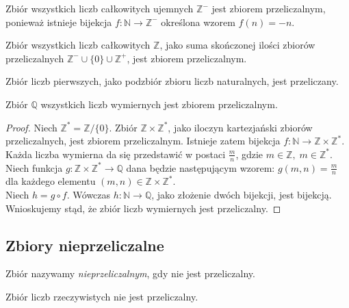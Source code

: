 	\begin{przyk}
		Zbiór wszystkich liczb całkowitych ujemnych $\mathbb{Z}^-$ jest zbiorem przeliczalnym, ponieważ istnieje bijekcja $f:\mathbb{N} \to \mathbb{Z}^-$ określona wzorem $f(n) = -n$.
	\end{przyk}
	
	\begin{przyk}
		Zbiór wszystkich liczb całkowitych $\mathbb{Z}$, jako suma skończonej ilości zbiorów przeliczalnych $\mathbb{Z}^- \cup \{0\} \cup \mathbb{Z}^+$, jest zbiorem przeliczalnym.
	\end{przyk}
	
	\begin{przyk}
		Zbiór liczb pierwszych, jako podzbiór zbioru liczb naturalnych, jest przeliczany.
	\end{przyk}
	
	\begin{przyk}
		Zbiór $\mathbb{Q}$ wszystkich liczb wymiernych jest zbiorem przeliczalnym.
		\begin{proof}
			Niech $\mathbb{Z}^{*} = \mathbb{Z}/\{0\}$.
			Zbiór $\mathbb{Z} \times \mathbb{Z}^*$, jako iloczyn kartezjański zbiorów przeliczalnych, jest zbiorem przeliczalnym. Istnieje zatem bijekcja $f:\mathbb{N} \to \mathbb{Z} \times \mathbb{Z}^*$. \\
			Każda liczba wymierna da się przedstawić w postaci $\frac{m}{n}$, gdzie $m \in \mathbb{Z}, \; m \in \mathbb{Z}^*$. Niech funkcja $g:\mathbb{Z} \times \mathbb{Z}^* \to \mathbb{Q}$ dana będzie następującym wzorem: $g(m,n) = \frac{m}{n}$ dla każdego elementu $(m,n) \in \mathbb{Z} \times \mathbb{Z}^*$. \\
			Niech $h= g \circ f$. Wówczas  $h: \mathbb{N} \to  \mathbb{Q}$, jako złożenie dwóch bijekcji, jest bijekcją. Wnioskujemy stąd, że zbiór liczb wymiernych jest przeliczalny.
		\end{proof}		 
	\end{przyk}
	
	
	\subsection{Zbiory nieprzeliczalne}
	\begin{df}
		Zbiór nazywamy \textit{nieprzeliczalnym}, gdy nie jest przeliczalny.
	\end{df}		
	
	\begin{tw}[Cantora]\label{tw.Cantora}
		Zbiór liczb rzeczywistych nie jest przeliczalny.
	\end{tw}	
	
